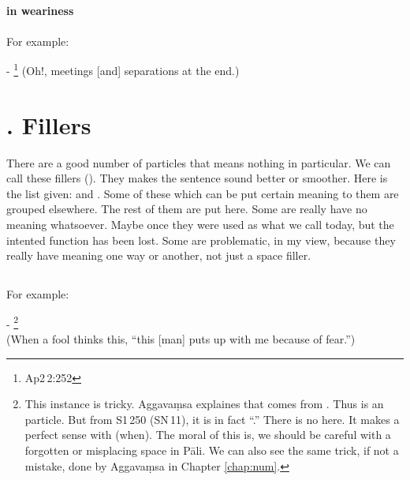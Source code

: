 \subsection*{}\label{nip:haa}
\paragraph*{ in weariness} For example:\par
- \footnote{Ap2\,2:252} (Oh!, meetings [and] separations at the end.) \par

\label{nipgrp19}
\section*{. Fillers}

There are a good number of particles that means nothing in particular. We can call these fillers (). They makes the sentence sound better or smoother. Here is the list given:  and . Some of these which can be put certain meaning to them are grouped elsewhere. The rest of them are put here. Some are really have no meaning whatsoever. Maybe once they were used as what we call  today, but the intented function has been lost. Some are problematic, in my view, because they really have meaning one way or another, not just a space filler.

\subsection*{}\label{nip:aa}
For example:\par
- \footnote{This instance is tricky. Aggava\d msa explaines that  comes from . Thus  is an particle. But from S1\,250 (SN\,11), it is in fact ``.'' There is no  here. It makes a perfect sense with  (when). The moral of this is, we should be careful with a forgotten or misplacing space in P\=ali. We can also see the same trick, if not a mistake, done by Aggava\d msa in Chapter \ref{chap:num}.} \\(When a fool thinks this, ``this [man] puts up with me because of fear.'') \par

